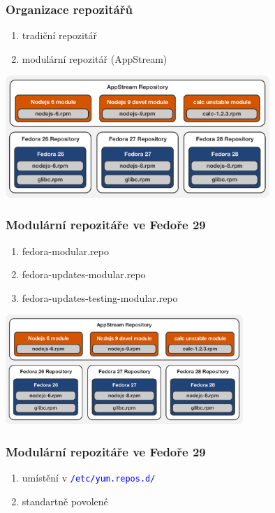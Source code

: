 \documentclass[12pt]{beamer}
\begin{document}
\begin{frame}
\frametitle{Organizace repozitářů}

\begin{enumerate}
	\item tradiční repozitář
	\item modulární repozitář (AppStream)
\end{enumerate}

\begin{center}
	\includegraphics[width=10cm]{repos}
\end{center}
\end{frame}

\begin{frame}
\frametitle{Modulární repozitáře ve Fedoře 29}

\begin{enumerate}
	\item fedora-modular.repo
	\item fedora-updates-modular.repo
	\item fedora-updates-testing-modular.repo
\end{enumerate}

\begin{center}
	\includegraphics[width=9cm]{repos}
\end{center}
\end{frame}

\begin{frame}
\frametitle{Modulární repozitáře ve Fedoře 29}

\begin{enumerate}
	\item umístění v \textcolor{blue}{\texttt{/etc/yum.repos.d/}}
	\item standartně povolené
\end{enumerate}
\end{frame}
\end{document}
